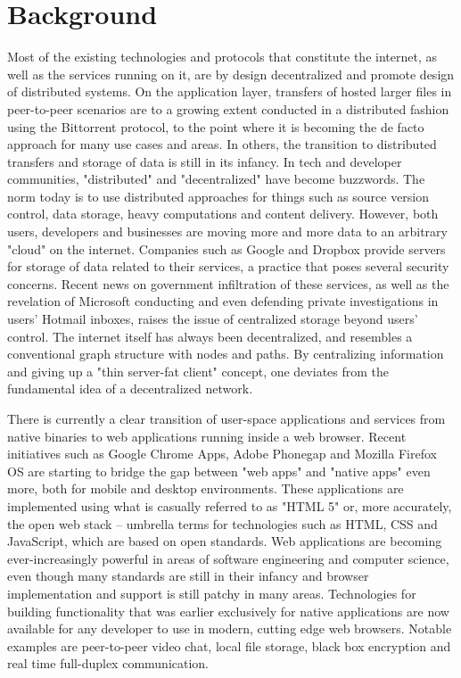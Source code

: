 \section{Background}
Most of the existing technologies and protocols that constitute the internet, as well as the services running on it, are by design decentralized and promote design of distributed systems. On the application layer, transfers of hosted larger files in peer-to-peer scenarios are to a growing extent conducted in a distributed fashion using the Bittorrent protocol, to the point where it is becoming the de facto approach for many use cases and areas. In others, the transition to distributed transfers and storage of data is still in its infancy. In tech and developer communities, "distributed" and "decentralized" have become buzzwords. The norm today is to use distributed approaches for things such as source version control, data storage, heavy computations and content delivery.
However, both users, developers and businesses are moving more and more data to an arbitrary "cloud" on the internet. Companies such as Google and Dropbox provide servers for storage of data related to their services, a practice that poses several security concerns. Recent news on government infiltration of these services, as well as the revelation of Microsoft conducting and even defending private investigations in users' Hotmail inboxes, raises the issue of centralized storage beyond users' control. The internet itself has always been decentralized, and resembles a conventional graph structure with nodes and paths. By centralizing information and giving up a "thin server-fat client" concept, one deviates from the fundamental idea of a decentralized network.

There is currently a clear transition of user-space applications and services from native binaries to web applications running inside a web browser. Recent initiatives such as Google Chrome Apps, Adobe Phonegap and Mozilla Firefox OS are starting to bridge the gap between "web apps" and "native apps" even more, both for mobile and desktop environments. These applications are implemented using what is casually referred to as "HTML 5" or, more accurately, the open web stack – umbrella terms for technologies such as HTML, CSS and JavaScript, which are based on open standards. Web applications are becoming ever-increasingly powerful in areas of software engineering and computer science, even though many standards are still in their infancy and browser implementation and support is still patchy in many areas. Technologies for building functionality that was earlier exclusively for native applications are now available for any developer to use in modern, cutting edge web browsers. Notable examples are peer-to-peer video chat, local file storage, black box encryption and real time full-duplex communication.

